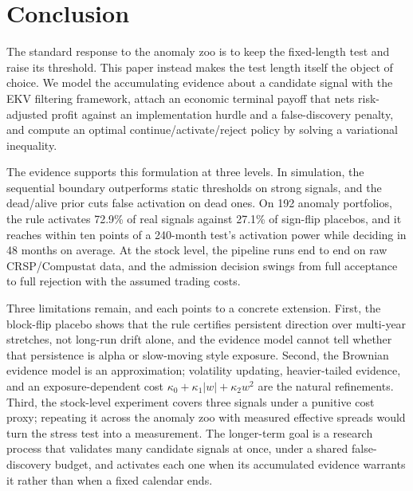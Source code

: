 \documentclass[11pt]{article}
\begin{document}
\section{Conclusion}
\label{sec:conclusion}

The standard response to the anomaly zoo is to keep the fixed-length test and raise
its threshold.  This paper instead makes the test length itself the object of choice.
We model the accumulating evidence about a candidate signal with the EKV filtering
framework, attach an economic terminal payoff that nets risk-adjusted profit against
an implementation hurdle and a false-discovery penalty, and compute an optimal
continue/activate/reject policy by solving a variational inequality.

The evidence supports this formulation at three levels.  In simulation, the sequential
boundary outperforms static thresholds on strong signals, and the dead/alive prior cuts
false activation on dead ones.  On 192 anomaly portfolios, the rule activates 72.9\% of
real signals against 27.1\% of sign-flip placebos, and it reaches within ten points of
a 240-month test's activation power while deciding in 48 months on average.  At the
stock level, the pipeline runs end to end on raw CRSP/Compustat data, and the
admission decision swings from full acceptance to full rejection with the assumed
trading costs.

Three limitations remain, and each points to a concrete extension.  First, the
block-flip placebo shows that the rule certifies persistent direction over multi-year
stretches, not long-run drift alone, and the evidence model cannot tell whether that
persistence is alpha or slow-moving style exposure.  Second, the Brownian evidence
model is an approximation; volatility updating, heavier-tailed evidence, and an
exposure-dependent cost $\kappa_0+\kappa_1|w|+\kappa_2w^2$ are the natural
refinements.  Third, the stock-level experiment covers three signals under a punitive
cost proxy; repeating it across the anomaly zoo with measured effective spreads would
turn the stress test into a measurement.  The longer-term goal is a research process
that validates many candidate signals at once, under a shared false-discovery budget,
and activates each one when its accumulated evidence warrants it rather than when a
fixed calendar ends.


\begingroup
\footnotesize

\endgroup
\end{document}
